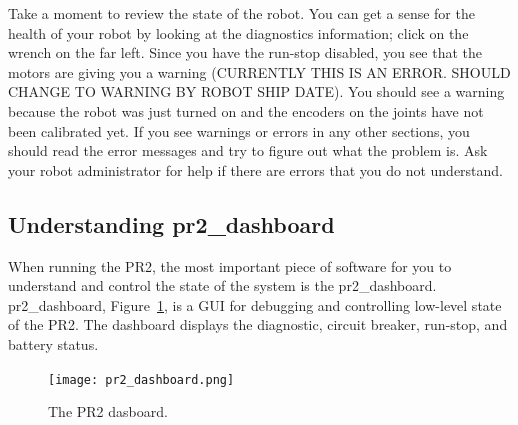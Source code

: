 Take a moment to review the state of the robot. You can get a sense for the health of 
your robot by looking at the diagnostics information; click on the wrench on the far left.  Since you have the run-stop 
disabled, you see that the motors are giving you a warning (CURRENTLY THIS IS AN ERROR.  SHOULD CHANGE TO WARNING BY 
ROBOT SHIP DATE).  You should see a warning because the robot was just turned on and the encoders on the joints have not 
been calibrated yet.
If you see warnings or errors in any other sections, you should read the error messages and try to figure out what the 
problem is.  Ask your robot administrator for help if there are errors that you do not understand.
\subsection{Understanding pr2\_dashboard}
When running the PR2, the most important piece of software for you to understand and control the state of the system is 
the pr2\_dashboard. pr2\_dashboard, Figure~\ref{fig:dashboard}, is a GUI for debugging and controlling low-level state 
of the PR2. The dashboard displays the diagnostic, circuit breaker, run-stop, and battery status.
\begin{figure}[h]
\centering
\texttt{[image: pr2\_dashboard.png]}
\caption{The PR2 dasboard.}
\label{fig:dashboard}
\end{figure}
